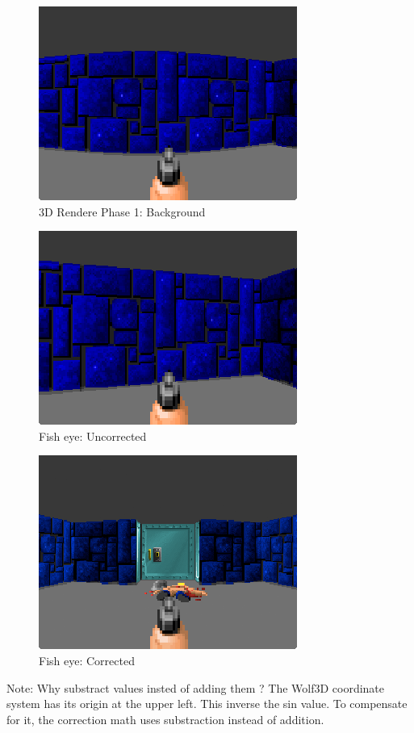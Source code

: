 \documentclass[book.tex]{subfiles}
\begin{document}
 

 







 \begin{figure}[H]
\centering
 \includegraphics[scale=1.3]{imgs/fish_eye/fish_eye.png}
 \caption{3D Rendere Phase 1: Background} \label{fig:mips}
 \end{figure}
 
 
  \begin{figure}[H]
\centering
 \includegraphics[scale=1.3]{imgs/fish_eye/fish_eye_corrected.png}
 \caption{Fish eye: Uncorrected} \label{fig:mips}
 \end{figure}
 
  \begin{figure}[H]
\centering
 \includegraphics[scale=1.3]{imgs/fish_eye/fish_eyed_start_screen2.png}
 \caption{Fish eye: Corrected} \label{fig:mips}
 \end{figure}
 Note: Why substract values insted of adding them ? The Wolf3D coordinate system has its origin at the upper left. This inverse the sin value. To compensate for it, the correction math uses substraction instead of addition.
\end{document}
